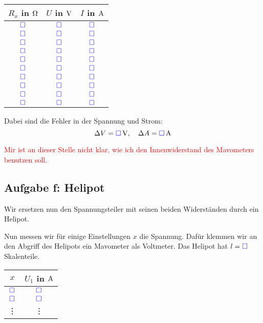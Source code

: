 \documentclass[11pt,german]{article}
\newcommand{\messwert}{\textcolor{blue}{\square}}
\begin{document}
\begin{center}
	\begin{tabular}{ccc}
		$R_x$ in $\unit \Omega$ & $U$ in $\unit V$ & $I$ in $\unit A$ \\
		\hline
		$\messwert$ & $\messwert$ & $\messwert$ \\
		$\messwert$ & $\messwert$ & $\messwert$ \\
		$\messwert$ & $\messwert$ & $\messwert$ \\
		$\messwert$ & $\messwert$ & $\messwert$ \\
		$\messwert$ & $\messwert$ & $\messwert$ \\
		$\messwert$ & $\messwert$ & $\messwert$ \\
		$\messwert$ & $\messwert$ & $\messwert$ \\
		$\messwert$ & $\messwert$ & $\messwert$ \\
		$\messwert$ & $\messwert$ & $\messwert$ \\
		$\messwert$ & $\messwert$ & $\messwert$
	\end{tabular}
\end{center}

Dabei sind die Fehler in der Spannung und Strom:
\[ \Delta V = \unit[\messwert]V, \quad \Delta A = \unit[\messwert] A \]

\textcolor{red}{Mir ist an dieser Stelle nicht klar, wie ich den
Innenwiderstand des Mavometers benutzen soll.}

\subsection{Aufgabe f: Helipot}

\label{durchführung-f}

Wir ersetzen nun den Spannungsteiler mit seinen beiden Widerständen durch ein Helipot.

Nun messen wir für einige Einstellungen $x$ die Spannung. Dafür klemmen wir an den Abgriff des Helipots ein Mavometer als Voltmeter. Das Helipot hat $l = \messwert$ Skalenteile.

\begin{center}
	\begin{tabular}{cc}
		$x$ & $U_1$ in $\unit A$ \\
		\hline
		$\messwert$ & $\messwert$ \\
		$\messwert$ & $\messwert$ \\
			 \vdots & \vdots
	\end{tabular}
\end{center}
\end{document}
